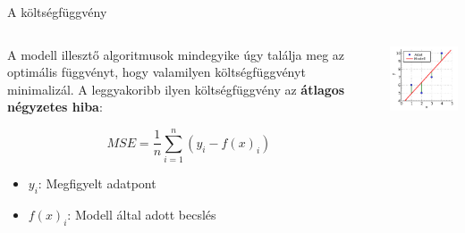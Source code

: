 \documentclass[english, aspectratio=169]{beamer}
\begin{document}
\begin{frame}{A költségfüggvény}
\begin{columns}
\begin{column}{.5\textwidth}
A modell illesztő algoritmusok mindegyike úgy találja meg az optimális függvényt, hogy valamilyen költségfüggvényt minimalizál. A leggyakoribb ilyen költségfüggvény az \textbf{átlagos négyzetes hiba}:
\begin{block}{}
\[
MSE = \frac{1}{n} \sum_{i=1}^n \left( y_i - f(x)_i \right) 
\]
\begin{itemize}
	\item $y_i$: Megfigyelt adatpont
	\item $f(x)_i$: Modell által adott becslés
\end{itemize}
\end{block}
\end{column}
\begin{column}{.5\textwidth}
\begin{center}
\includegraphics[width=6cm, keepaspectratio]{images/ql_11.png}
\end{center}
\end{column}
\end{columns}
\end{frame}
\end{document}

